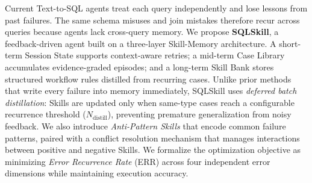 Current Text-to-SQL agents treat each query independently and lose lessons from past failures. 
The same schema misuses and join mistakes therefore recur across queries because agents lack cross-query memory. We propose \textbf{SQLSkill}, a feedback-driven agent built on a three-layer Skill-Memory architecture. 
A short-term Session State supports context-aware retries; a mid-term Case Library accumulates evidence-graded episodes; and a long-term Skill Bank stores structured workflow rules distilled from recurring cases. 
Unlike prior methods that write every failure into memory immediately, SQLSkill uses \emph{deferred batch distillation}: Skills are updated only when same-type cases reach a configurable recurrence threshold ($N_{\text{distill}}$), preventing premature generalization from noisy feedback. 
We also introduce \emph{Anti-Pattern Skills} that encode common failure patterns, paired with a conflict resolution mechanism that manages interactions between positive and negative Skills. 
We formalize the optimization objective as minimizing \emph{Error Recurrence Rate} (ERR) across four independent error dimensions while maintaining execution accuracy.
